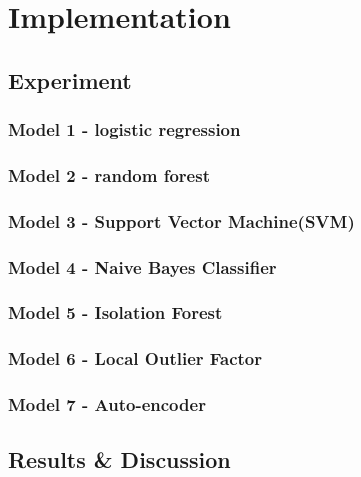 \chapter{Implementation}


\section{Experiment}

\subsection{Model 1 - logistic regression}

\subsection{Model 2 - random forest}

\subsection{Model 3 - Support Vector Machine(SVM)}

\subsection{Model 4 - Naive Bayes Classifier}

\subsection{Model 5 - Isolation Forest}

\subsection{Model 6 - Local Outlier Factor}


\subsection{Model 7 - Auto-encoder}



\section{Results & Discussion}

